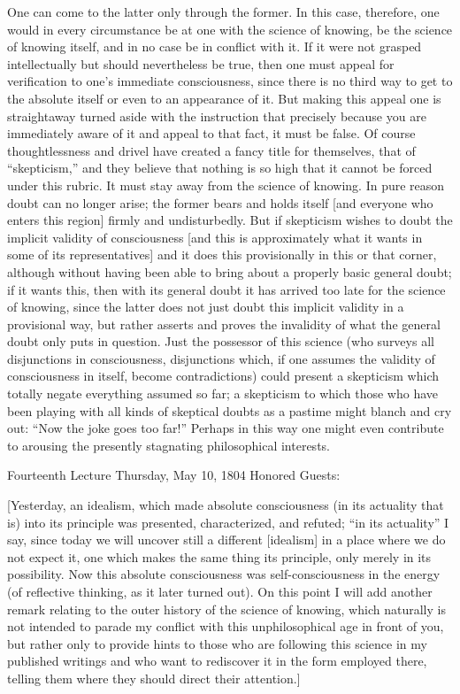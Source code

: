 One can come to the latter only through the former.
In this case, therefore, one would in every circumstance
be at one with the science of knowing,
be the science of knowing itself,
and in no case be in conflict with it.
If it were not grasped intellectually
but should nevertheless be true,
then one must appeal for verification
to one’s immediate consciousness,
since there is no third way to get to the absolute itself
or even to an appearance of it.
But making this appeal one is straightaway turned aside
with the instruction that precisely because you are
immediately aware of it and appeal to that fact,
it must be false.
Of course thoughtlessness and drivel have
created a fancy title for themselves,
that of “skepticism,” and they believe that nothing is
so high that it cannot be forced under this rubric.
It must stay away from the science of knowing.
In pure reason doubt can no longer arise;
the former bears and holds itself
[and everyone who enters this region]
firmly and undisturbedly.
But if skepticism wishes to doubt
the implicit validity of consciousness
[and this is approximately what it
wants in some of its representatives]
and it does this provisionally in this or that corner,
although without having been able to bring about a properly basic
general doubt;
if it wants this, then with its general doubt
it has arrived too late for the science of knowing,
since the latter does not just doubt
this implicit validity in a provisional way,
but rather asserts and proves the invalidity of
what the general doubt only puts in question.
Just the possessor of this science
(who surveys all disjunctions in consciousness,
disjunctions which, if one assumes the validity
of consciousness in itself, become contradictions)
could present a skepticism which totally negate
everything assumed so far;
a skepticism to which those who have been playing
with all kinds of skeptical doubts as a pastime
might blanch and cry out: “Now the joke goes too far!”
Perhaps in this way one might even contribute
to arousing the presently stagnating philosophical interests.

Fourteenth Lecture
Thursday, May 10, 1804
Honored Guests:

[Yesterday, an idealism, which made absolute consciousness
(in its actuality that is) into its principle was
presented, characterized, and refuted;
“in its actuality” I say,
since today we will uncover still
a different [idealism] in a place
where we do not expect it,
one which makes the same thing its principle,
only merely in its possibility.
Now this absolute consciousness was self-consciousness
in the energy (of reflective thinking, as it later turned out).
On this point I will add another remark
relating to the outer history of the science of knowing,
which naturally is not intended to parade my conflict
with this unphilosophical age in front of you,
but rather only to provide hints to those
who are following this science in my published writings
and who want to rediscover it in the form employed there,
telling them where they should direct their attention.]

